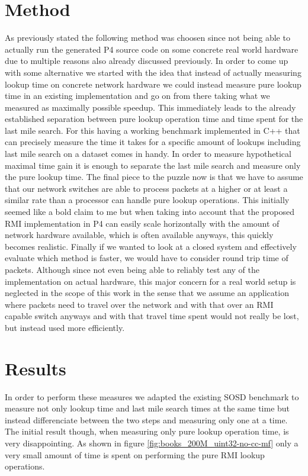 \section{Method}
As previously stated the following method was choosen since not being able to actually run the generated P4 source code on some concrete real world hardware due to multiple reasons also already discussed previously. In order to come up with some alternative we started with the idea that instead of actually measuring lookup time on concrete network hardware we could instead measure pure lookup time in an existing implementation and go on from there taking what we measured as maximally possible speedup. This immediately leads to the already established separation between pure lookup operation time and time spent for the last mile search. For this having a working benchmark implemented in C++ that can precisely measure the time it takes for a specific amount of lookups including last mile search on a dataset comes in handy. In order to measure hypothetical maximal time gain it is enough to separate the last mile search and measure only the pure lookup time. The final piece to the puzzle now is that we have to assume that our network switches are able to process packets at a higher or at least a similar rate than a processor can handle pure lookup operations. This initially seemed like a bold claim to me but when taking into account that the proposed RMI implementation in P4 can easily scale horizontally with the amount of network hardware available, which is often available anyways, this quickly becomes realistic. Finally if we wanted to look at a closed system and effectively evaluate which method is faster, we would have to consider round trip time of packets. Although since not even being able to reliably test any of the implementation on actual hardware, this major concern for a real world setup is neglected in the scope of this work in the sense that we assume an application where packets need to travel over the network and with that over an RMI capable switch anyways and with that travel time spent would not really be lost, but instead used more efficiently.

\section{Results}
\label{sect:measurements:results}
In order to perform these measures we adapted the existing SOSD benchmark to measure not only lookup time and last mile search times at the same time but instead differenciate between the two steps and measuring only one at a time. The initial result though, when measuring only pure lookup operation time, is very disappointing. As shown in figure \ref{fig:books_200M_uint32-no-cc-mf} only a very small amount of time is spent on performing the pure RMI lookup operations.

